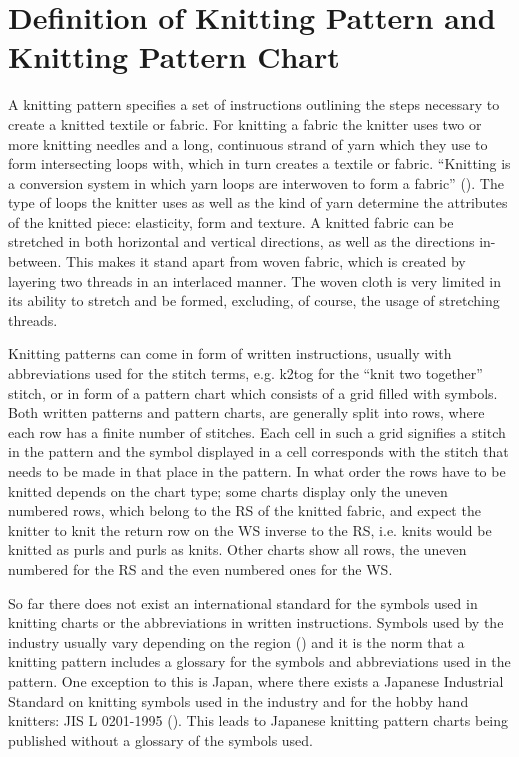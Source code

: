 \section{Definition of Knitting Pattern and Knitting Pattern Chart}

A knitting pattern specifies a set of instructions outlining the steps necessary to create a knitted textile or fabric. For knitting a fabric the knitter uses two or more knitting needles and a long, continuous strand of yarn which they use to form intersecting loops with, which in turn creates a textile or fabric. ``Knitting is a conversion system in which yarn loops are interwoven to form a fabric'' (\cite[p17]{Raz1993}). The type of loops the knitter uses as well as the kind of yarn determine the attributes of the knitted piece: elasticity, form and texture. A knitted fabric can be stretched in both horizontal and vertical directions, as well as the directions in-between. This makes it stand apart from woven fabric, which is created by layering two threads in an interlaced manner. The woven cloth is very limited in its ability to stretch and be formed, excluding, of course, the usage of stretching threads.

Knitting patterns can come in form of written instructions, usually with abbreviations used for the stitch terms, e.g. k2tog for the ``knit two together'' stitch, or in form of a pattern chart which consists of a grid filled with symbols. Both written patterns and pattern charts, are generally split into rows, where each row has a finite number of stitches. Each cell in such a grid signifies a stitch in the pattern and the symbol displayed in a cell corresponds with the stitch that needs to be made in that place in the pattern. In what order the rows have to be knitted depends on the chart type; some charts display only the uneven numbered rows, which belong to the \gls{RS} of the knitted fabric, and expect the knitter to knit the return row on the \gls{WS} inverse to the \gls{RS}, i.e. knits would be knitted as purls and purls as knits. Other charts show all rows, the uneven numbered for the \gls{RS} and the even numbered ones for the WS.

So far there does not exist an international standard for the symbols used in knitting charts or the abbreviations in written instructions. Symbols used by the industry usually vary depending on the region (\cite[p57]{Raz1993}) and it is the norm that a knitting pattern includes a glossary for the symbols and abbreviations used in the pattern. One exception to this is Japan, where there exists a Japanese Industrial Standard on knitting symbols used in the industry and for the hobby hand knitters: JIS L 0201-1995 (\cite{JKCA1995}). This leads to Japanese knitting pattern charts being published without a glossary of the symbols used.

